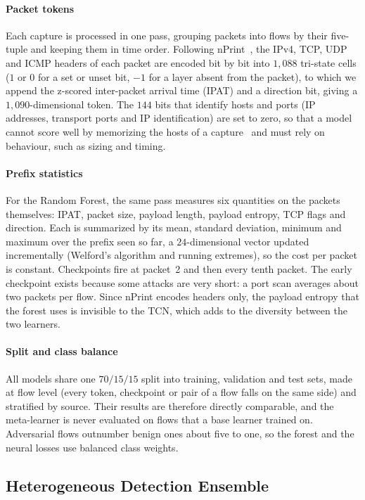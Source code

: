 \documentclass[acmtog,nonacm,pbalance]{acmart}
\begin{document}
\paragraph{Packet tokens} Each capture is processed in one pass, grouping
packets into flows by their five-tuple and keeping them in time order.
Following nPrint~\cite{holland2021nprint}, the IPv4, TCP, UDP and ICMP headers
of each packet are encoded bit by bit into $1{,}088$ tri-state cells ($1$ or $0$
for a set or unset bit, $-1$ for a layer absent from the packet), to which we
append the z-scored inter-packet arrival time (IPAT) and a direction bit,
giving a $1{,}090$-dimensional token. The $144$ bits that identify hosts and
ports (IP addresses, transport ports and IP identification) are set to zero, so
that a model cannot score well by memorizing the hosts of a
capture~\cite{arp2022dos} and must rely on behaviour, such as sizing and timing.

\paragraph{Prefix statistics} For the Random Forest, the same pass measures six
quantities on the packets themselves: IPAT, packet size, payload length,
payload entropy, TCP flags and direction. Each is summarized by its mean,
standard deviation, minimum and maximum over the prefix seen so far, a
$24$-dimensional vector updated incrementally (Welford's algorithm and running
extremes), so the cost per packet is constant. Checkpoints fire at packet~2 and
then every tenth packet. The early checkpoint exists because some attacks are
very short: a port scan averages about two packets per flow. Since nPrint
encodes headers only, the payload entropy that the forest uses is invisible to
the TCN, which adds to the diversity between the two learners.

\paragraph{Split and class balance} All models share one $70/15/15$ split into
training, validation and test sets, made at flow level (every token, checkpoint
or pair of a flow falls on the same side) and stratified by source. Their results are
therefore directly comparable, and the meta-learner is never evaluated on flows
that a base learner trained on. Adversarial flows outnumber benign ones about
five to one, so the forest and the neural losses use balanced class weights.

\subsection{Heterogeneous Detection Ensemble}\label{sec:ensemble}
\end{document}
